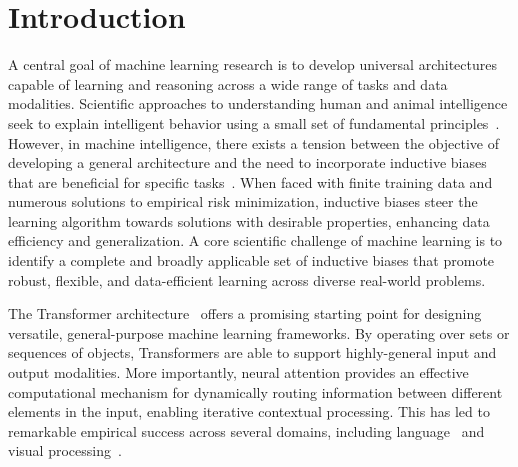 \section{Introduction}\label{sec:intro}

A central goal of machine learning research is to develop universal architectures capable of learning and reasoning across a wide range of tasks and data modalities. Scientific approaches to understanding human and animal intelligence seek to explain intelligent behavior using a small set of fundamental principles~\citep{marcus2003algebraic}. However, in machine intelligence, there exists a tension between the objective of developing a general architecture and the need to incorporate inductive biases that are beneficial for specific tasks~\citep{wolpert1995no,baxter2000model}. When faced with finite training data and numerous solutions to empirical risk minimization, inductive biases steer the learning algorithm towards solutions with desirable properties, enhancing data efficiency and generalization.
A core scientific challenge of machine learning is to identify a complete and broadly applicable set of inductive biases that promote robust, flexible, and data-efficient learning across diverse real-world problems.


The Transformer architecture~\citep{vaswani2017attention} offers a promising starting point for designing versatile, general-purpose machine learning frameworks. By operating over sets or sequences of objects, Transformers are able to support highly-general input and output modalities. More importantly, neural attention provides an effective computational mechanism for dynamically routing information between different elements in the input, enabling iterative contextual processing. This has led to remarkable empirical success across several domains, including language~\citep{radfordImprovingLanguageUnderstanding2018,devlinBERTPretrainingDeep2019,radford2019language,kaplan2020scalinglawsneurallanguage,brown2020languagemodelsfewshotlearners} and visual processing~\citep{dosovitskiyImageWorth16x162020,carion2020end,zhai2022scaling}.

